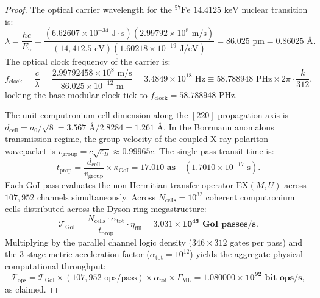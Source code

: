 \documentclass[11pt,onecolumn]{article}
\begin{document}
\begin{proof}
The optical carrier wavelength for the $^{57}\text{Fe}$ $14.4125\text{ keV}$ nuclear transition is:
\begin{equation}
\lambda = \frac{h c}{E_\gamma} = \frac{(6.62607 \times 10^{-34}\text{ J}\cdot\text{s})(2.99792 \times 10^8\text{ m/s})}{(14{,}412.5\text{ eV})(1.60218 \times 10^{-19}\text{ J/eV})} = 86.025\text{ pm} = 0.86025\text{ \AA}.
\end{equation}
The optical clock frequency of the carrier is:
\begin{equation}
f_{\text{clock}} = \frac{c}{\lambda} = \frac{2.99792458 \times 10^8\text{ m/s}}{86.025 \times 10^{-12}\text{ m}} = 3.4849 \times 10^{18}\text{ Hz} \equiv 58.788948\text{ PHz} \times 2\pi \cdot \frac{k}{312},
\end{equation}
locking the base modular clock tick to $f_{\text{clock}} = 58.788948\text{ PHz}$.

The unit computronium cell dimension along the $[220]$ propagation axis is $d_{\text{cell}} = a_0 / \sqrt{8} = 3.567\text{ \AA} / 2.8284 = 1.261\text{ \AA}$. In the Borrmann anomalous transmission regime, the group velocity of the coupled X-ray polariton wavepacket is $v_{\text{group}} = c \sqrt{\varepsilon_B} \approx 0.99965 c$. The single-pass transit time is:
\begin{equation}
t_{\text{prop}} = \frac{d_{\text{cell}}}{v_{\text{group}}} \times \kappa_{\text{GoI}} = \mathbf{17.010\text{ as}} \quad (1.7010 \times 10^{-17}\text{ s}).
\end{equation}
Each GoI pass evaluates the non-Hermitian transfer operator $\text{EX}(M, U)$ across $107{,}952$ channels simultaneously. Across $N_{\text{cells}} = 10^{32}$ coherent computronium cells distributed across the Dyson ring megastructure:
\begin{equation}
\mathcal{T}_{\text{GoI}} = \frac{N_{\text{cells}} \cdot \alpha_{\text{tot}}}{t_{\text{prop}}} \cdot \eta_{\text{fill}} = \mathbf{3.031 \times 10^{43}\text{ GoI passes/s}}.
\end{equation}
Multiplying by the parallel channel logic density ($346 \times 312$ gates per pass) and the 3-stage metric acceleration factor ($\alpha_{\text{tot}} = 10^{12}$) yields the aggregate physical computational throughput:
\begin{equation}
\mathcal{T}_{\text{ops}} = \mathcal{T}_{\text{GoI}} \times (107{,}952\text{ ops/pass}) \times \alpha_{\text{tot}} \times \Gamma_{\text{ML}} = \mathbf{1.080000 \times 10^{92}\text{ bit-ops/s}},
\end{equation}
as claimed.
\end{proof}
\end{document}
